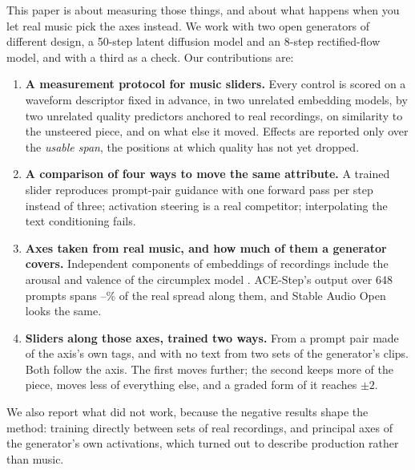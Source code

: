 This paper is about measuring those things, and about what happens when you let real music pick the axes instead. We work with two open generators of different design, a 50-step latent diffusion model and an 8-step rectified-flow model, and with a third as a check. Our contributions are:
\begin{enumerate}
\item \textbf{A measurement protocol for music sliders.} Every control is scored on a waveform descriptor fixed in advance, in two unrelated embedding models, by two unrelated quality predictors anchored to real recordings, on similarity to the unsteered piece, and on what else it moved. Effects are reported only over the \emph{usable span}, the positions at which quality has not yet dropped.
\item \textbf{A comparison of four ways to move the same attribute.} A trained slider reproduces prompt-pair guidance with one forward pass per step instead of three; activation steering is a real competitor; interpolating the text conditioning fails.
\item \textbf{Axes taken from real music, and how much of them a generator covers.} Independent components of embeddings of \covReal{} recordings include the arousal and valence of the circumplex model \citep{russell1980circumplex}. ACE-Step's output over 648 prompts spans \covLo{}--\covHi{}\% of the real spread along them, and Stable Audio Open looks the same.
\item \textbf{Sliders along those axes, trained two ways.} From a prompt pair made of the axis's own tags, and with no text from two sets of the generator's clips. Both follow the axis. The first moves further; the second keeps more of the piece, moves less of everything else, and a graded form of it reaches $\pm2$.
\end{enumerate}
We also report what did not work, because the negative results shape the method: training directly between sets of real recordings, and principal axes of the generator's own activations, which turned out to describe production rather than music.
